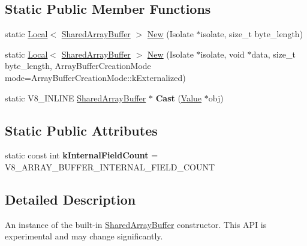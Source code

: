 \subsection*{Static Public Member Functions}
\begin{DoxyCompactItemize}
\item 
static \mbox{\hyperlink{classv8_1_1Local}{Local}}$<$ \mbox{\hyperlink{classv8_1_1SharedArrayBuffer}{Shared\+Array\+Buffer}} $>$ \mbox{\hyperlink{classv8_1_1SharedArrayBuffer_a0e7060cc31105c5bf780d770c1a7acc6}{New}} (Isolate $\ast$isolate, size\+\_\+t byte\+\_\+length)
\item 
static \mbox{\hyperlink{classv8_1_1Local}{Local}}$<$ \mbox{\hyperlink{classv8_1_1SharedArrayBuffer}{Shared\+Array\+Buffer}} $>$ \mbox{\hyperlink{classv8_1_1SharedArrayBuffer_af708b1765380ad42b7d572dfc531c21c}{New}} (Isolate $\ast$isolate, void $\ast$data, size\+\_\+t byte\+\_\+length, Array\+Buffer\+Creation\+Mode mode=Array\+Buffer\+Creation\+Mode\+::k\+Externalized)
\item 
\mbox{\label{classv8_1_1SharedArrayBuffer_ac4e1ba5d4564c7033814f4cc45fdda84}} 
static V8\+\_\+\+I\+N\+L\+I\+NE \mbox{\hyperlink{classv8_1_1SharedArrayBuffer}{Shared\+Array\+Buffer}} $\ast$ {\bfseries Cast} (\mbox{\hyperlink{classv8_1_1Value}{Value}} $\ast$obj)
\end{DoxyCompactItemize}
\subsection*{Static Public Attributes}
\begin{DoxyCompactItemize}
\item 
\mbox{\label{classv8_1_1SharedArrayBuffer_a6f47f6b441e37aefd1a9d0176e8a3da8}} 
static const int {\bfseries k\+Internal\+Field\+Count} = V8\+\_\+\+A\+R\+R\+A\+Y\+\_\+\+B\+U\+F\+F\+E\+R\+\_\+\+I\+N\+T\+E\+R\+N\+A\+L\+\_\+\+F\+I\+E\+L\+D\+\_\+\+C\+O\+U\+NT
\end{DoxyCompactItemize}


\subsection{Detailed Description}
An instance of the built-\/in \mbox{\hyperlink{classv8_1_1SharedArrayBuffer}{Shared\+Array\+Buffer}} constructor. This A\+PI is experimental and may change significantly. 

